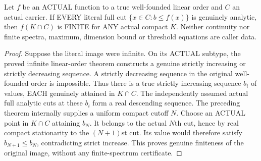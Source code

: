 \begin{theorem}
\label{hir:actual-well-founded-analytic-full-cuts-compact-finite-values}
\leanok
Let $f$ be an ACTUAL function to a true well-founded linear order and $C$
an actual carrier. If EVERY literal full cut
$\{x\in C:b\le f(x)\}$ is genuinely analytic, then $f(K\cap C)$ is FINITE
for ANY actual compact $K$. Neither continuity nor finite spectra,
maximum, dimension bound or threshold equations are caller data.
\end{theorem}
\begin{proof}
Suppose the literal image were infinite. On its ACTUAL subtype, the proved
infinite linear-order theorem constructs a genuine strictly increasing or
strictly decreasing sequence. A strictly decreasing sequence in the
original well-founded order is impossible. Thus there is a true strictly
increasing sequence $b_i$ of values, EACH genuinely attained in $K\cap C$.
The independently assumed actual full analytic cuts at these $b_i$ form a
real descending sequence. The preceding theorem internally supplies a
uniform compact cutoff $N$. Choose an ACTUAL point in $K\cap C$ attaining
$b_N$. It belongs to the actual $N$th cut, hence by real compact stationarity
to the $(N+1)$st cut. Its value would therefore satisfy $b_{N+1}\le b_N$,
contradicting strict increase. This proves genuine finiteness of the
original image, without any finite-spectrum certificate.
\end{proof}

